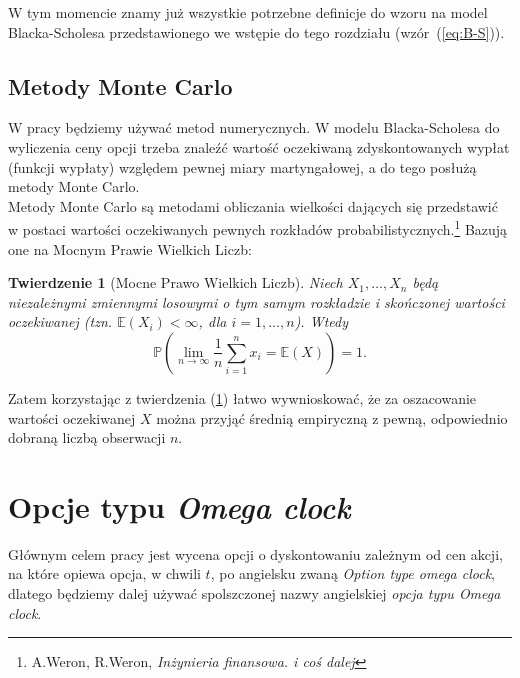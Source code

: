 \documentclass[]{pwr_wmat_praca_dyplomowa}
\theoremstyle{plain}
\newtheorem{theorem}{Twierdzenie}
\numberwithin{theorem}{chapter}
\theoremstyle{definition}
\numberwithin{theorem}{chapter}
\begin{document}
\noindent W tym momencie znamy już wszystkie potrzebne definicje do wzoru na model Blacka-Scholesa przedstawionego we wstępie do tego rozdziału (wzór~(\ref{eq:B-S})).
 
 
\section{Metody Monte Carlo}

W pracy będziemy używać metod numerycznych. W modelu Blacka-Scholesa do wyliczenia ceny opcji trzeba znaleźć wartość oczekiwaną zdyskontowanych wypłat (funkcji wypłaty) względem pewnej miary martyngałowej, a do tego posłużą metody Monte Carlo.\\

Metody Monte Carlo są metodami obliczania wielkości dających się przedstawić w postaci wartości oczekiwanych pewnych rozkładów probabilistycznych.\footnote{A.Weron, R.Weron, \textit{Inżynieria finansowa. i coś dalej}} Bazują one na Mocnym Prawie Wielkich Liczb:

\begin{theorem}[Mocne Prawo Wielkich Liczb]
\label{th:MPWL}
Niech $X_1,\ldots,X_n$ będą niezależnymi zmiennymi losowymi o tym samym rozkładzie i skończonej wartości oczekiwanej (tzn. $\mathbb{E}(X_i)<\infty$, dla $i=1,\ldots,n$). Wtedy
\begin{equation*}
 \mathbb{P}(\lim_{n\rightarrow \infty}\frac{1}{n}\sum_{i=1}^n x_i = \mathbb{E}(X)) = 1.
\end{equation*}
\end{theorem}
\noindent Zatem korzystając z twierdzenia (\ref{th:MPWL}) łatwo wywnioskować, że za oszacowanie wartości oczekiwanej $X$ można przyjąć średnią empiryczną z pewną, odpowiednio dobraną liczbą obserwacji $n$.

\chapter{Opcje typu \textit{Omega clock}}
\label{opcje}
Głównym celem pracy jest wycena opcji o dyskontowaniu zależnym od cen akcji, na które opiewa opcja, w chwili $t$, po angielsku zwaną \textit{Option type omega clock}, dlatego będziemy dalej używać spolszczonej nazwy angielskiej \textit{opcja typu Omega clock}. \\
\end{document}
